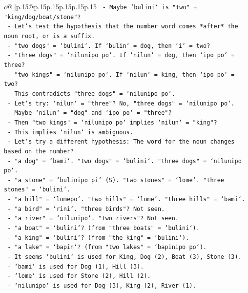 \documentclass{article}
\begin{document}
{\begin{supertabular}{c@{$\;$}|p{.15\linewidth}@{}p{.15\linewidth}p{.15\linewidth}p{.15\linewidth}p{.15\linewidth}p{.15\linewidth}}
{{{\texttt{   {-} Maybe `bulini` is "two" + "king/dog/boat/stone"?} \\
\texttt{   {-} Let's test the hypothesis that the number word comes *after* the noun root, or is a suffix.} \\
\texttt{   {-} "two dogs" = `bulini`. If `bulin` = dog, then `i` = two?} \\
\texttt{   {-} "three dogs" = `nilunipo po`. If `nilun` = dog, then `ipo po` = three?} \\
\texttt{   {-} "two kings" = `nilunipo po`. If `nilun` = king, then `ipo po` = two?} \\
\texttt{   {-} This contradicts "three dogs" = `nilunipo po`.} \\
\texttt{   {-} Let's try: `nilun` = "three"? No, "three dogs" = `nilunipo po`.} \\
\texttt{   {-} Maybe `nilun` = "dog" and `ipo po` = "three"?} \\
\texttt{   {-} Then "two kings" = `nilunipo po` implies `nilun` = "king"?} \\
\texttt{   {-} This implies `nilun` is ambiguous.} \\
\texttt{   {-} Let's try a different hypothesis: The word for the noun changes based on the number?} \\
\texttt{   {-} "a dog" = `bami`. "two dogs" = `bulini`. "three dogs" = `nilunipo po`.} \\
\texttt{   {-} "a stone" = `bulinipo pi` (S). "two stones" = `lome`. "three stones" = `bulini`.} \\
\texttt{   {-} "a hill" = `lomepo`. "two hills" = `lome`. "three hills" = `bami`.} \\
\texttt{   {-} "a bird" = `rini`. "three birds"? Not seen.} \\
\texttt{   {-} "a river" = `nilunipo`. "two rivers"? Not seen.} \\
\texttt{   {-} "a boat" = `bulini`? (from "three boats" = `bulini`).} \\
\texttt{   {-} "a king" = `bulini`? (from "the king" = `bulini`).} \\
\texttt{   {-} "a lake" = `bapin`? (from "two lakes" = `bapinipo po`).} \\
\texttt{   {-} It seems `bulini` is used for King, Dog (2), Boat (3), Stone (3).} \\
\texttt{   {-} `bami` is used for Dog (1), Hill (3).} \\
\texttt{   {-} `lome` is used for Stone (2), Hill (2).} \\
\texttt{   {-} `nilunipo` is used for Dog (3), King (2), River (1).} \\
}}}
\end{supertabular}}
\end{document}
